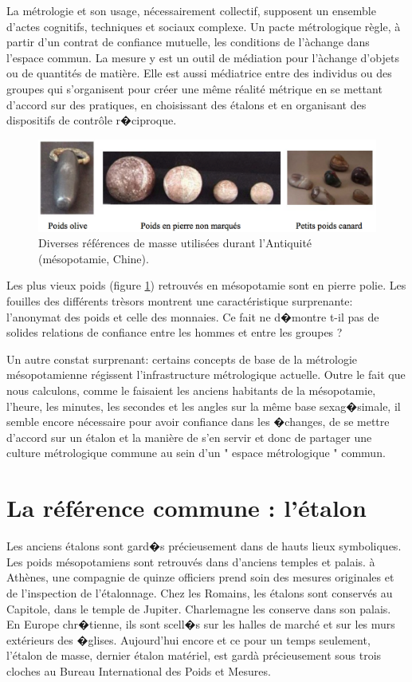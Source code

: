 La métrologie et son usage, nécessairement collectif, supposent un ensemble d'actes cognitifs, techniques et sociaux complexe.  Un pacte métrologique règle, à partir d'un contrat de confiance mutuelle, les conditions de l'àchange dans l'espace commun.  La mesure y est un outil de médiation pour l'àchange d'objets ou de quantités de matière.  Elle est aussi médiatrice entre des individus ou des groupes qui s'organisent pour créer une même réalité métrique en se mettant d'accord sur des pratiques, en choisissant des étalons et en organisant des dispositifs de contrôle r�ciproque.

\begin{figure}[h]
   \centering
   \includegraphics[width=15cm]{assets/figures/poids.pdf}
   \caption{Diverses références de masse utilisées durant l'Antiquité (mésopotamie, Chine).}
   \label{fig:1.1}
\end{figure}
Les plus vieux poids (figure \ref{fig:1.1}) retrouvés en mésopotamie sont en pierre polie.  Les fouilles des différents trèsors montrent une caractéristique surprenante: l'anonymat des poids et celle des monnaies.  Ce fait ne d�montre t-il pas de solides relations de confiance entre les hommes et entre les groupes ?

Un autre constat surprenant: certains concepts de base de la métrologie mésopotamienne régissent l'infrastructure métrologique actuelle. Outre le fait que nous calculons, comme le faisaient les anciens habitants de la mésopotamie, l'heure, les minutes, les secondes et les angles sur la même base sexag�simale, il semble encore nécessaire pour avoir confiance dans les �changes, de se mettre d'accord sur un étalon et la manière de s'en servir et donc de partager une culture métrologique commune au sein d'un " espace métrologique " commun.

\section{La référence commune : l'étalon}

Les anciens étalons sont gard�s précieusement dans de hauts lieux symboliques.  Les poids mésopotamiens sont retrouvés dans d'anciens temples et palais.  à Athènes, une compagnie de quinze officiers prend soin des mesures originales et de l'inspection de l'étalonnage.  Chez les Romains, les étalons sont conservés au Capitole, dans le temple de Jupiter. Charlemagne les conserve dans son palais.  En Europe chr�tienne, ils sont scell�s sur les halles de marché et sur les murs extérieurs des �glises.  Aujourd'hui encore et ce pour un temps seulement, l'étalon de masse, dernier étalon matériel, est gardà précieusement sous trois cloches au Bureau International des Poids et Mesures.

